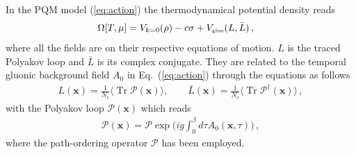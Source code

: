 \documentclass[%
reprint,
superscriptaddress,
showpacs,preprintnumbers,
 amsmath,amssymb,
 aps,
prd,
]{revtex4-1}
\newcommand{\Tr}{\ensuremath{\operatorname{Tr}}}
\def\Eq#1{Eq.~(\ref{#1})}
\begin{document}
In the PQM model (\ref{eq:action}) the thermodynamical potential density reads
\begin{align}
  \Omega[T,\mu]&=V_{k=0}(\rho)-c\sigma+V_{\text{\tiny{glue}}}(L, \bar L)\,,\label{eq:omega}
\end{align}
where all the fields are on their respective equations of motion. $L$ is the traced Polyakov loop and $\bar L$ is its complex conjugate. They are related to the temporal gluonic background field $A_0$ in \Eq{eq:action} through the equations as follows
\begin{align}
L(\bm x)=\frac{1}{N_c}\langle \Tr{\mathcal{P}(\bm x)} \rangle ,\qquad \bar{L} (\bm x)=\frac{1}{N_c}\langle \Tr{\mathcal{P}^{\dagger}(\bm x)} \rangle\,,\label{}
\end{align}
with the Polyakov loop $\mathcal{P}(\bm x)$ which reads
\begin{align}
\mathcal{P}(\bm x)=\mathcal{P}\exp\bigg( ig\int_{0}^{\beta}d\tau A_0(\bm x,\tau) \bigg)\,,\label{}
\end{align}
where the path-ordering operator $\mathcal{P}$ has been employed.
\end{document}
